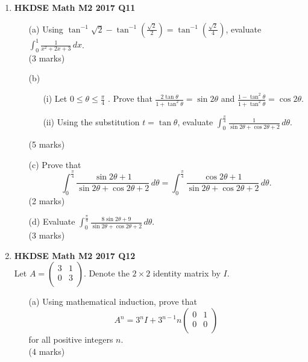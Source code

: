 \documentclass{report}
\begin{document}
\begin{enumerate}
	\item \textbf{HKDSE Math M2 2017 Q11}
	\begin{enumerate}
		\item [(a)]Using $\displaystyle\tan^{-1}{\sqrt{2}} - \tan^{-1}{\left(\frac{\sqrt{2}}{2}\right)} = \tan^{-1}{\left(\frac{\sqrt{2}}{4}\right)}$, evaluate $\displaystyle\int_{0}^{1} \frac{1}{x^2+2x+3}\,dx $. \\(3 marks)
		\item [(b)]
		\begin{enumerate}
			\item [(i)]Let $0 \leq \theta \leq \displaystyle\frac{\pi}{4}$ . Prove that $\displaystyle\frac{2\tan{\theta}}{1 + \tan^2{\theta}} = \sin{2\theta}$ and $\displaystyle\frac{1-\tan^2{\theta}}{1 + \tan^2{\theta}} = \cos{2\theta}$.
			\item [(ii)]Using the substitution $t = \tan{\theta}$, evaluate $\displaystyle\int_{0}^{\tfrac{\pi}{4}} \frac{1}{\sin{2\theta} + \cos{2\theta} + 2} \,d\theta$.
		\end{enumerate}
		(5 marks)
		\item [(c)]Prove that $$\displaystyle\int_{0}^{\tfrac{\pi}{4}} \frac{\sin{2\theta}+1 }{\sin{2\theta} + \cos{2\theta} + 2} \,d\theta = \displaystyle\int_{0}^{\tfrac{\pi}{4}} \frac{\cos{2\theta}+1}{\sin{2\theta} + \cos{2\theta} + 2} \,d\theta.$$(2 marks)
		\item [(d)]Evaluate $\displaystyle\int_{0}^{\tfrac{\pi}{4}} \frac{8\sin{2\theta} + 9}{\sin{2\theta} + \cos{2\theta} + 2} \,d\theta$. \\(3 marks)
	\end{enumerate}


	\item \textbf{HKDSE Math M2 2017 Q12}\\
	Let $A = \begin{pmatrix}
		3 & 1\\
		0 & 3\\
	\end{pmatrix}$. Denote the $2 \times 2$ identity matrix by $I$.
	\begin{enumerate}
		\item [(a)]Using mathematical induction, prove that $$A^n = 3^nI + 3^{n-1}n\begin{pmatrix}
			0&1\\0&0\\
			\end{pmatrix}$$ for all positive integers $n$. \\(4 marks)


\end{enumerate}
\end{enumerate}
\end{document}
